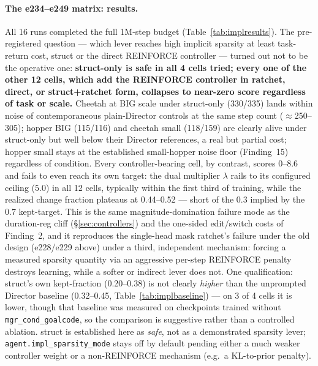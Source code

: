 \documentclass[10pt]{article}
\begin{document}
\paragraph{The e234--e249 matrix: results.} All 16 runs completed the full
1M-step budget (Table~\ref{tab:implresults}). The pre-registered question
--- which lever reaches high implicit sparsity at least task-return cost,
struct or the direct REINFORCE controller --- turned out not to be the
operative one: \textbf{struct-only is safe in all 4 cells tried; every one
of the other 12 cells, which add the REINFORCE controller in ratchet,
direct, or struct+ratchet form, collapses to near-zero score regardless of
task or scale.} Cheetah at BIG scale under struct-only (330/335) lands
within noise of contemporaneous plain-Director controls at the same step
count ($\approx$250--305); hopper BIG (115/116) and cheetah small
(118/159) are clearly alive under struct-only but well below their
Director references, a real but partial cost; hopper small stays at the
established small-hopper noise floor (Finding~15) regardless of condition.
Every controller-bearing cell, by contrast, scores 0--8.6 and fails to even
reach its own target: the dual multiplier $\lambda$ rails to its
configured ceiling ($5.0$) in all 12 cells, typically within the first
third of training, while the realized change fraction plateaus at
0.44--0.52 --- short of the 0.3 implied by the $0.7$ kept-target. This is
the same magnitude-domination failure mode as the duration-reg cliff
(\S\ref{sec:controllers}) and the one-sided edit/switch costs of Finding~2,
and it reproduces the single-head mask ratchet's failure under the old
design (e228/e229 above) under a third, independent mechanism: forcing a
measured sparsity quantity via an aggressive per-step REINFORCE penalty
destroys learning, while a softer or indirect lever does not. One
qualification: struct's own kept-fraction (0.20--0.38) is not clearly
\emph{higher} than the unprompted Director baseline (0.32--0.45,
Table~\ref{tab:implbaseline}) --- on 3 of 4 cells it is lower, though that
baseline was measured on checkpoints trained without
\texttt{mgr\_cond\_goalcode}, so the comparison is suggestive rather than a
controlled ablation. struct is established here as \emph{safe}, not as a
demonstrated sparsity lever; \texttt{agent.impl\_sparsity\_mode} stays off
by default pending either a much weaker controller weight or a
non-REINFORCE mechanism (e.g.\ a KL-to-prior penalty).
\end{document}
